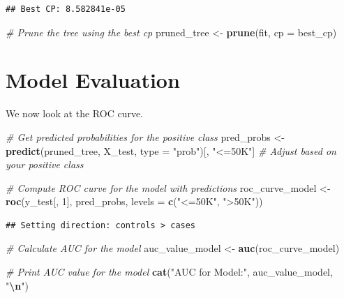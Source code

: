 \documentclass[
]{article}
\newenvironment{Shaded}{\begin{snugshade}}{\end{snugshade}}
\newcommand{\AttributeTok}[1]{\textcolor[rgb]{0.13,0.29,0.53}{#1}}
\newcommand{\CommentTok}[1]{\textcolor[rgb]{0.56,0.35,0.01}{\textit{#1}}}
\newcommand{\DecValTok}[1]{\textcolor[rgb]{0.00,0.00,0.81}{#1}}
\newcommand{\FunctionTok}[1]{\textcolor[rgb]{0.13,0.29,0.53}{\textbf{#1}}}
\newcommand{\NormalTok}[1]{#1}
\newcommand{\OtherTok}[1]{\textcolor[rgb]{0.56,0.35,0.01}{#1}}
\newcommand{\SpecialCharTok}[1]{\textcolor[rgb]{0.81,0.36,0.00}{\textbf{#1}}}
\newcommand{\StringTok}[1]{\textcolor[rgb]{0.31,0.60,0.02}{#1}}
\begin{document}
\begin{verbatim}
## Best CP: 8.582841e-05
\end{verbatim}

\begin{Shaded}
\begin{Highlighting}[]
\CommentTok{\# Prune the tree using the best cp}
\NormalTok{pruned\_tree }\OtherTok{\textless{}{-}} \FunctionTok{prune}\NormalTok{(fit, }\AttributeTok{cp =}\NormalTok{ best\_cp)}
\end{Highlighting}
\end{Shaded}

\section{Model Evaluation}\label{model-evaluation}

We now look at the ROC curve.

\begin{Shaded}
\begin{Highlighting}[]
\CommentTok{\# Get predicted probabilities for the positive class}
\NormalTok{pred\_probs }\OtherTok{\textless{}{-}} \FunctionTok{predict}\NormalTok{(pruned\_tree, X\_test, }\AttributeTok{type =} \StringTok{"prob"}\NormalTok{)[, }\StringTok{"\textless{}=50K"}\NormalTok{]  }\CommentTok{\# Adjust based on your positive class}

\CommentTok{\# Compute ROC curve for the model with predictions}
\NormalTok{roc\_curve\_model }\OtherTok{\textless{}{-}} \FunctionTok{roc}\NormalTok{(y\_test[, }\DecValTok{1}\NormalTok{], pred\_probs, }\AttributeTok{levels =} \FunctionTok{c}\NormalTok{(}\StringTok{"\textless{}=50K"}\NormalTok{, }\StringTok{"\textgreater{}50K"}\NormalTok{))}
\end{Highlighting}
\end{Shaded}

\begin{verbatim}
## Setting direction: controls > cases
\end{verbatim}

\begin{Shaded}
\begin{Highlighting}[]
\CommentTok{\# Calculate AUC for the model}
\NormalTok{auc\_value\_model }\OtherTok{\textless{}{-}} \FunctionTok{auc}\NormalTok{(roc\_curve\_model)}

\CommentTok{\# Print AUC value for the model}
\FunctionTok{cat}\NormalTok{(}\StringTok{"AUC for Model:"}\NormalTok{, auc\_value\_model, }\StringTok{"}\SpecialCharTok{\textbackslash{}n}\StringTok{"}\NormalTok{)}
\end{Highlighting}
\end{Shaded}
\end{document}
